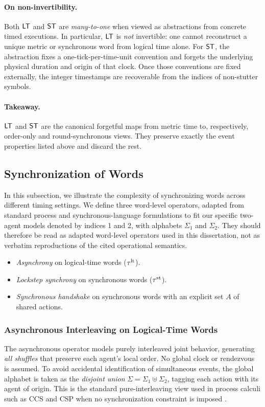 \paragraph{On non-invertibility.}
Both \(\mathsf{LT}\) and \(\mathsf{ST}\) are \emph{many-to-one} when viewed as abstractions from concrete timed executions. In particular, \(\mathsf{LT}\) is \emph{not} invertible: one cannot reconstruct a unique metric or synchronous word from logical time alone. For \(\mathsf{ST}\), the abstraction fixes a one-tick-per-time-unit convention and forgets the underlying physical duration and origin of that clock. Once those conventions are fixed externally, the integer timestamps are recoverable from the indices of non-stutter symbols.

\paragraph{Takeaway.}
\(\mathsf{LT}\) and \(\mathsf{ST}\) are the canonical forgetful maps from metric time to, respectively, order-only and round-synchronous views. They preserve exactly the event properties listed above and discard the rest.

\subsection{Synchronization of Words}\label{operators}
In this subsection, we illustrate the complexity of synchronizing words across different timing settings. We define three word-level operators, adapted from standard process and synchronous-language formulations to fit our specific two-agent models denoted by indices 1 and 2, with alphabets $\Sigma_1$ and $\Sigma_2$. They should therefore be read as adapted word-level operators used in this dissertation, not as verbatim reproductions of the cited operational semantics.
\begin{itemize}
  \item \emph{Asynchrony} on logical-time words (\(\tau^{\mathrm{lt}}\)).
  \item \emph{Lockstep synchrony} on synchronous words (\(\tau^{\mathrm{st}}\)).
  \item \emph{Synchronous handshake} on synchronous words with an explicit set \(A\) of shared actions.
\end{itemize}

\subsubsection{Asynchronous Interleaving on Logical-Time Words}
The asynchronous operator models purely interleaved joint behavior, generating \emph{all shuffles} that preserve each agent’s local order. No global clock or rendezvous is assumed. To avoid accidental identification of simultaneous events, the global alphabet is taken as the \emph{disjoint union} $\Sigma=\Sigma_1\uplus\Sigma_2$, tagging each action with its agent of origin. This is the standard pure-interleaving view used in process calculi such as CCS and CSP when no synchronization constraint is imposed \cite{Milner89,Hoare85}.

